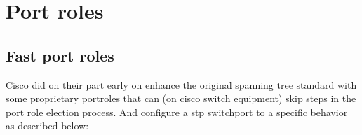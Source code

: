 
\section{Port roles}

\subsection{Fast port roles}
Cisco did on their part early on enhance the original spanning tree standard with some proprietary portroles that can (on cisco switch equipment) skip steps in the port role election process. And configure a \gls{stp} switchport to a specific behavior as described below:

